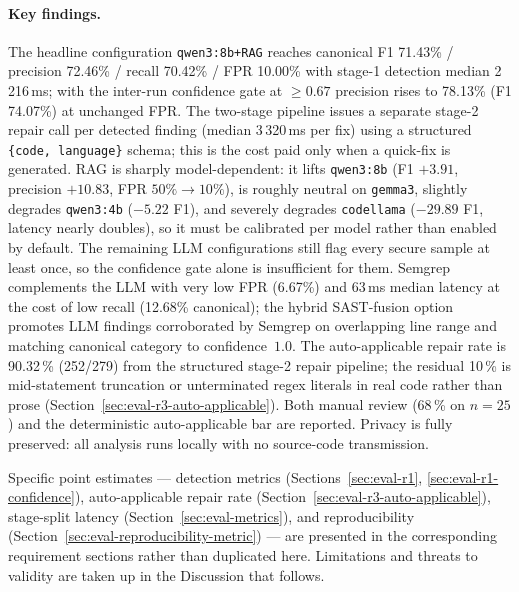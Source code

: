 \paragraph{Key findings.}
The headline configuration \texttt{qwen3:8b+RAG} reaches canonical F1 71.43\% / precision 72.46\% / recall 70.42\% / FPR 10.00\% with stage-1 detection median 2\,216\,ms; with the inter-run confidence gate at $\geq 0.67$ precision rises to 78.13\% (F1 74.07\%) at unchanged FPR. The two-stage pipeline issues a separate stage-2 repair call per detected finding (median 3\,320\,ms per fix) using a structured \texttt{\{code, language\}} schema; this is the cost paid only when a quick-fix is generated. RAG is sharply model-dependent: it lifts \texttt{qwen3:8b} (F1 $+3.91$, precision $+10.83$, FPR $50\%\!\to\!10\%$), is roughly neutral on \texttt{gemma3}, slightly degrades \texttt{qwen3:4b} ($-5.22$ F1), and severely degrades \texttt{codellama} ($-29.89$ F1, latency nearly doubles), so it must be calibrated per model rather than enabled by default. The remaining LLM configurations still flag every secure sample at least once, so the confidence gate alone is insufficient for them. Semgrep complements the LLM with very low FPR (6.67\%) and 63\,ms median latency at the cost of low recall (12.68\% canonical); the hybrid SAST-fusion option promotes LLM findings corroborated by Semgrep on overlapping line range and matching canonical category to confidence~$1.0$. The auto-applicable repair rate is 90.32\,\% (252/279) from the structured stage-2 repair pipeline; the residual 10\,\% is mid-statement truncation or unterminated regex literals in real code rather than prose (Section~\ref{sec:eval-r3-auto-applicable}). Both manual review (68\,\% on $n=25$) and the deterministic auto-applicable bar are reported. Privacy is fully preserved: all analysis runs locally with no source-code transmission.

Specific point estimates --- detection metrics (Sections~\ref{sec:eval-r1}, \ref{sec:eval-r1-confidence}), auto-applicable repair rate (Section~\ref{sec:eval-r3-auto-applicable}), stage-split latency (Section~\ref{sec:eval-metrics}), and reproducibility (Section~\ref{sec:eval-reproducibility-metric}) --- are presented in the corresponding requirement sections rather than duplicated here. Limitations and threats to validity are taken up in the Discussion that follows.
